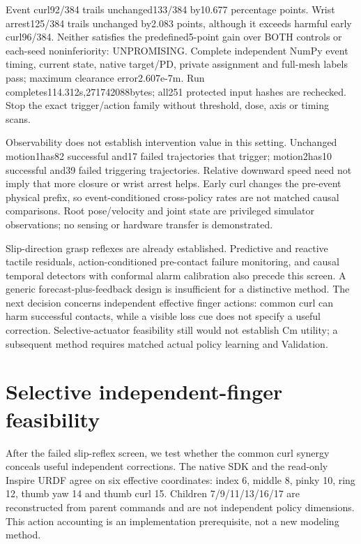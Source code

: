 \documentclass[10pt]{article}
\begin{document}
\begin{table}[ht]\centering

\caption{Prospective natural-retention physical105 counts. Each pooled policy
has384 trajectories, each seed192, and each motion128. All trajectories and the
original criterion are retained; no event-conditioned subgroup replaces the
primary. These are mechanical controller results, not Cm training.}
\end{table}

Event curl92/384 trails unchanged133/384 by10.677 percentage points. Wrist
arrest125/384 trails unchanged by2.083 points, although it exceeds harmful early
curl96/384. Neither satisfies the predefined5-point gain over BOTH controls or
each-seed noninferiority: UNPROMISING. Complete independent NumPy event timing,
current state, native target/PD, private assignment and full-mesh labels pass;
maximum clearance error2.607e-7m. Run completes114.312s,271742088bytes; all251
protected input hashes are rechecked. Stop the exact trigger/action family
without threshold, dose, axis or timing scans.

Observability does not establish intervention value in this setting. Unchanged
motion1has82 successful and17 failed trajectories that trigger; motion2has10
successful and39 failed triggering trajectories. Relative downward speed need
not imply that more closure or wrist arrest helps. Early curl changes the
pre-event physical prefix, so event-conditioned cross-policy rates are not
matched causal comparisons. Root pose/velocity and joint state are privileged
simulator observations; no sensing or hardware transfer is demonstrated.

Slip-direction grasp reflexes are already established\cite{abd2018}. Predictive
and reactive tactile residuals\cite{zhou2026}, action-conditioned pre-contact
failure monitoring\cite{zheng2026}, and causal temporal detectors with conformal
alarm calibration\cite{zhang2026} also precede this screen. A generic
forecast-plus-feedback design is insufficient for a distinctive method. The
next decision concerns independent effective finger actions: common curl can
harm successful contacts, while a visible loss cue does not specify a useful
correction. Selective-actuator feasibility still would not establish Cm utility;
a subsequent method requires matched actual policy learning and Validation.

\section{Selective independent-finger feasibility}
After the failed slip-reflex screen, we test whether the common curl synergy
conceals useful independent corrections. The native SDK and the read-only
Inspire URDF agree on six effective coordinates: index 6, middle 8, pinky 10,
ring 12, thumb yaw 14 and thumb curl 15. Children 7/9/11/13/16/17 are reconstructed
from parent commands and are not independent policy dimensions. This action
accounting is an implementation prerequisite, not a new modeling method.
\end{document}
